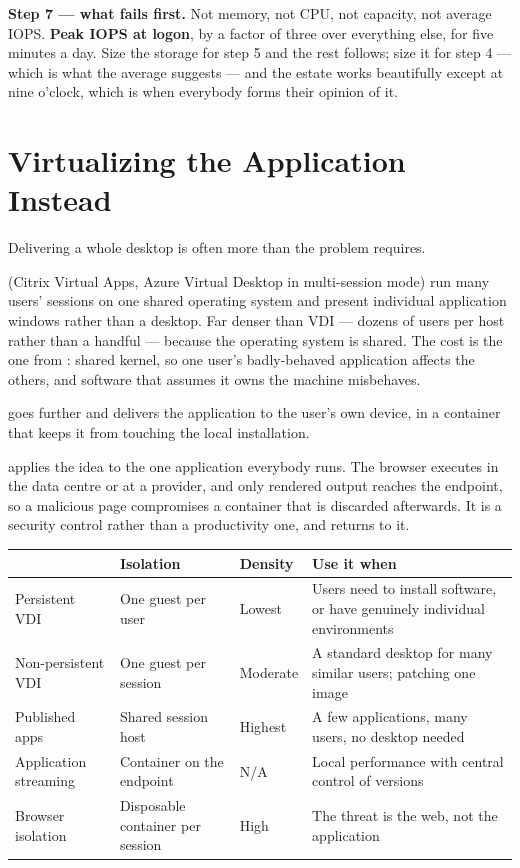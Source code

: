 \begin{worked}
\smallskip
\textbf{Step 7 --- what fails first.} Not memory, not CPU, not capacity, not
average IOPS. \textbf{Peak IOPS at logon}, by a factor of three over everything
else, for five minutes a day. Size the storage for step 5 and the rest follows;
size it for step 4 --- which is what the average suggests --- and the estate
works beautifully except at nine o'clock, which is when everybody forms their
opinion of it.
\end{worked}

\section{Virtualizing the Application Instead}

Delivering a whole desktop is often more than the problem requires.

 (Citrix Virtual Apps, Azure Virtual Desktop in
multi-session mode) run many users' sessions on one shared 
operating system and present individual application windows rather than a
desktop. Far denser than VDI --- dozens of users per host rather than a handful
--- because the operating system is shared. The cost is the one from
: shared kernel, so one user's badly-behaved application
affects the others, and software that assumes it owns the machine misbehaves.

 goes further and delivers the application to the
user's own device, in a container that keeps it from touching the local
installation.

 applies the idea to the one application
everybody runs. The browser executes in the data centre or at a provider, and
only rendered output reaches the endpoint, so a malicious page compromises a
container that is discarded afterwards. It is a security control rather than a
productivity one, and  returns to it.

\begin{longtable}{@{}L{3.4cm}L{3.5cm}L{3.5cm}L{4.0cm}@{}}
\toprule
{}
& \textbf{Isolation} & \textbf{Density} & \textbf{Use it when} \\
\midrule
\endhead
Persistent VDI & One guest per user & Lowest & Users need to install software,
or have genuinely individual environments \\
Non-persistent VDI & One guest per session & Moderate & A standard desktop for
many similar users; patching one image \\
Published apps & Shared session host & Highest & A few applications, many
users, no desktop needed \\
Application streaming & Container on the endpoint & N/A & Local performance
with central control of versions \\
Browser isolation & Disposable container per session & High & The threat is
the web, not the application \\
\bottomrule
\end{longtable}


